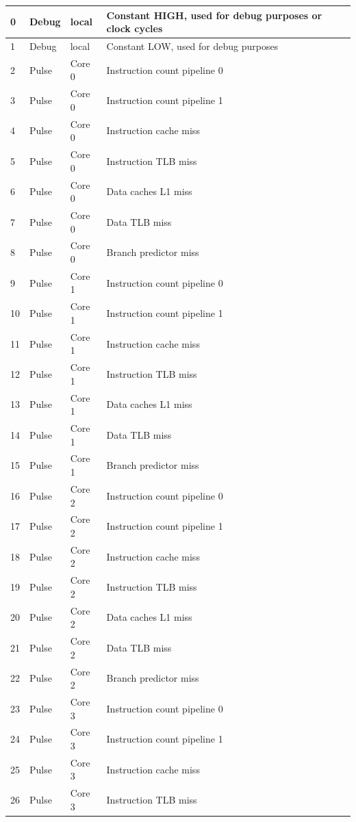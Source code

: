 \begin{table}[H]
\begin{footnotesize}
\begin{tabular}{|l|l|l|l|l|}
\hline
0 & Debug & local &  Constant HIGH, used for debug purposes or clock cycles \\
\hline 
1 & Debug & local &  Constant LOW, used for debug purposes \\
\hline 
2 & Pulse & Core 0 &  Instruction count pipeline 0 \\
\hline 
3 & Pulse & Core 0 &  Instruction count pipeline 1 \\
\hline 
4 & Pulse & Core 0 &  Instruction cache miss \\
\hline 
5 & Pulse & Core 0 &  Instruction TLB miss \\
\hline 
6 & Pulse & Core 0 &  Data caches L1 miss \\
\hline 
7 & Pulse & Core 0 &  Data TLB miss \\
\hline 
8 & Pulse & Core 0 &  Branch predictor miss \\
\hline 
9 & Pulse & Core 1 &  Instruction count pipeline 0 \\
\hline 
10 & Pulse & Core 1 &  Instruction count pipeline 1 \\
\hline 
11 & Pulse & Core 1 &  Instruction cache miss \\
\hline 
12 & Pulse & Core 1 &  Instruction TLB miss \\
\hline 
13 & Pulse & Core 1 &  Data caches L1 miss \\
\hline 
14 & Pulse & Core 1 &  Data TLB miss \\
\hline 
15 & Pulse & Core 1 &  Branch predictor miss \\
\hline 
16 & Pulse & Core 2 &  Instruction count pipeline 0 \\
\hline 
17 & Pulse & Core 2 &  Instruction count pipeline 1 \\
\hline 
18 & Pulse & Core 2 &  Instruction cache miss \\
\hline 
19 & Pulse & Core 2 &  Instruction TLB miss \\
\hline 
20 & Pulse & Core 2 &  Data caches L1 miss \\
\hline 
21 & Pulse & Core 2 &  Data TLB miss \\
\hline 
22 & Pulse & Core 2 &  Branch predictor miss \\
\hline 
23 & Pulse & Core 3 &  Instruction count pipeline 0 \\
\hline 
24 & Pulse & Core 3 &  Instruction count pipeline 1 \\
\hline 
25 & Pulse & Core 3 &  Instruction cache miss \\
\hline 
26 & Pulse & Core 3 &  Instruction TLB miss \\

\end{tabular}
\end{footnotesize}
\end{table}
